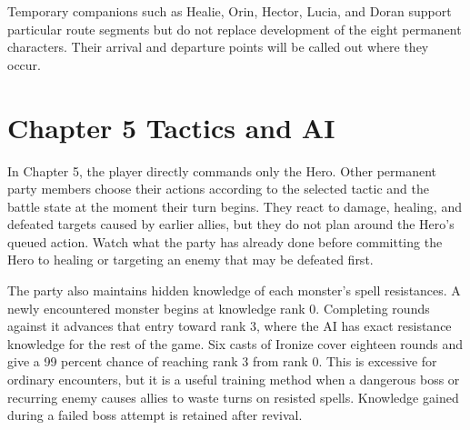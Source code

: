 \documentclass[
  american,
  10pt,
  letterpaper,
  oneside,
  open=any]{scrreprt}
\begin{document}
Temporary companions such as Healie, Orin, Hector, Lucia, and Doran
support particular route segments but do not replace development of the
eight permanent characters. Their arrival and departure points will be
called out where they occur.

\section{Chapter 5 Tactics and AI}\label{chapter-5-tactics-and-ai}

In Chapter 5, the player directly commands only the Hero. Other
permanent party members choose their actions according to the selected
tactic and the battle state at the moment their turn begins. They react
to damage, healing, and defeated targets caused by earlier allies, but
they do not plan around the Hero's queued action. Watch what the party
has already done before committing the Hero to healing or targeting an
enemy that may be defeated first.

The party also maintains hidden knowledge of each monster's spell
resistances. A newly encountered monster begins at knowledge rank 0.
Completing rounds against it advances that entry toward rank 3, where
the AI has exact resistance knowledge for the rest of the game. Six
casts of Ironize cover eighteen rounds and give a 99 percent chance of
reaching rank 3 from rank 0. This is excessive for ordinary encounters,
but it is a useful training method when a dangerous boss or recurring
enemy causes allies to waste turns on resisted spells. Knowledge gained
during a failed boss attempt is retained after revival.
\end{document}

